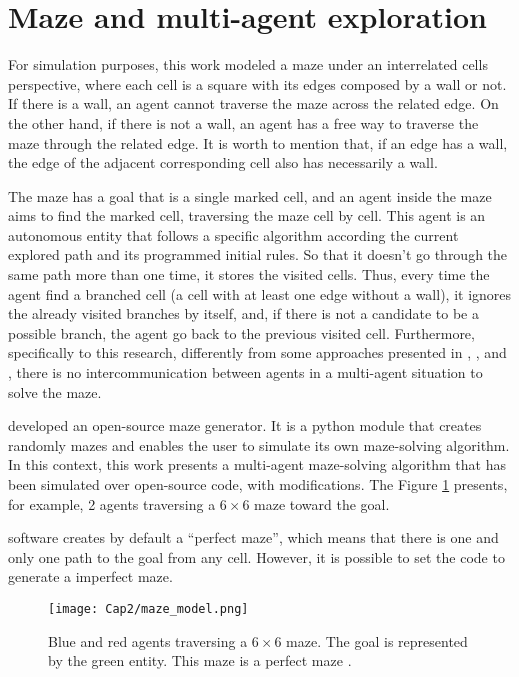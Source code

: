 \section{Maze and multi-agent exploration}
\label{section_models_maze}
For simulation purposes, this work modeled a maze under an interrelated cells perspective, where each cell is a square with its edges composed by a wall or not. If there is a wall, an agent cannot traverse the maze across the related edge. On the other hand, if there is not a wall, an agent has a free way to traverse the maze through the related edge. It is worth to mention that, if an edge has a wall, the edge of the adjacent corresponding cell also has necessarily a wall.

The maze has a goal that is a single marked cell, and an agent inside the maze aims to find the marked cell, traversing the maze cell by cell. This agent is an autonomous entity that follows a specific algorithm according the current explored path and its programmed initial rules. So that it doesn't go through the same path more than one time, it stores the visited cells. Thus, every time the agent find a branched cell (a cell with at least one edge without a wall), it ignores the already visited branches by itself, and, if there is not a candidate to be a possible branch, the agent go back to the previous visited cell. Furthermore, specifically to this research, differently from some approaches presented in , , and , there is no intercommunication between agents in a multi-agent situation to solve the maze.

 developed an open-source maze generator. It is a python module that creates randomly mazes and enables the user to simulate its own maze-solving algorithm. In this context, this work presents a multi-agent maze-solving algorithm that has been simulated over  open-source code, with modifications. The Figure \ref{maze_model} presents, for example, 2 agents traversing a $6 \times 6$ maze toward the goal.

 software creates by default a ``perfect maze'', which means that there is one and only one path to the goal from any cell. However, it is possible to set the code to generate a imperfect maze.

\begin{figure}[ht!]
\centering
\texttt{[image: Cap2/maze\_model.png]}
\caption{Blue and red agents traversing a $6\times 6$ maze. The goal is represented by the green entity. This maze is a perfect maze \cite{Muhammad2021}.}
\label{maze_model}
\end{figure}

